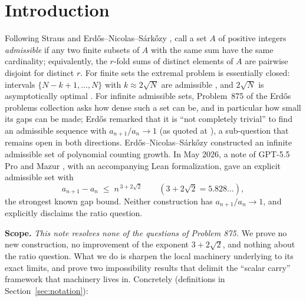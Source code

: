 \documentclass[11pt]{article}
\theoremstyle{definition}
\theoremstyle{remark}
\begin{document}
\section{Introduction}\label{sec:intro}

Following Straus \cite{Straus66} and Erd\H{o}s--Nicolas--S\'ark\H{o}zy
\cite{ENS91}, call a set $A$ of positive integers \emph{admissible} if any
two finite subsets of $A$ with the same sum have the same cardinality;
equivalently, the $r$-fold sums of distinct elements of $A$ are pairwise
disjoint for distinct $r$. For finite sets the extremal problem is
essentially closed: intervals $\{N-k+1,\dots,N\}$ with $k\approx2\sqrt N$
are admissible \cite{Straus66}, and $2\sqrt N$ is asymptotically optimal
\cite{DF95,DF99}. For infinite admissible sets, Problem~875 of the
Erd\H{o}s problems collection \cite{EP875} asks how dense such a set can
be, and in particular how small its gaps can be made; Erd\H{o}s remarked
that it is ``not completely trivial'' to find an admissible sequence with
$a_{n+1}/a_n\to1$ (as quoted at \cite{EP875}), a sub-question that remains
open in both directions. Erd\H{o}s--Nicolas--S\'ark\H{o}zy \cite{ENS91}
constructed an infinite admissible set of polynomial counting growth. In
May 2026, a note of GPT-5.5 Pro and Mazur \cite{Mazur26}, with an
accompanying Lean formalization, gave an explicit admissible set with
\[
a_{n+1}-a_n\;\le\; n^{\,3+2\sqrt2}\qquad(3+2\sqrt2=5.828\ldots),
\]
the strongest known gap bound. Neither construction has
$a_{n+1}/a_n\to1$, and \cite{Mazur26} explicitly disclaims the ratio
question.

\medskip
\noindent\textbf{Scope.} \emph{This note resolves none of the questions of
Problem 875.} We prove no new construction, no improvement of the exponent
$3+2\sqrt2$, and nothing about the ratio question. What we do is sharpen
the local machinery underlying \cite{Mazur26} to its exact limits, and
prove two impossibility results that delimit the ``scalar carry''
framework that machinery lives in. Concretely (definitions in
Section~\ref{sec:notation}):
\end{document}
